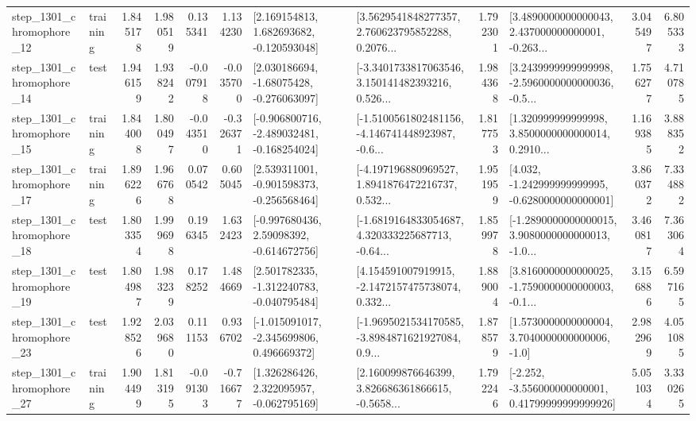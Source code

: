 \begin{tabular}{llrrrrllrlrr}
 step\_1301\_chromophore\_12 &  training &      1.845178 &    1.980519 &      0.135341 &  1.134230 &    [2.169154813, 1.682693682, -0.120593048] &  [3.5629541848277357, 2.760623795852288, 0.2076... &       1.792301 &  [3.4890000000000043, 2.437000000000001, -0.263... &            3.045497 &          6.805333 \\
 step\_1301\_chromophore\_14 &      test &      1.946159 &    1.938242 &     -0.007918 & -0.035700 &    [2.030186694, -1.68075428, -0.276063097] &  [-3.3401733817063546, 3.150141482393216, 0.526... &       1.984368 &  [3.2439999999999998, -2.5960000000000036, -0.5... &            1.756277 &          4.710785 \\
 step\_1301\_chromophore\_15 &  training &      1.844008 &    1.800497 &     -0.043510 & -0.326371 &  [-0.906800716, -2.489032481, -0.168254024] &  [-1.5100561802481156, -4.146741448923987, -0.6... &       1.817753 &  [1.320999999999998, 3.8500000000000014, 0.2910... &            1.169385 &          3.888352 \\
 step\_1301\_chromophore\_17 &  training &      1.896226 &    1.966768 &      0.070542 &  0.605045 &   [2.539311001, -0.901598373, -0.256568464] &  [-4.197196880969527, 1.8941876472216737, 0.532... &       1.951959 &   [4.032, -1.242999999999995, -0.6280000000000001] &            3.860372 &          7.334882 \\
 step\_1301\_chromophore\_18 &      test &      1.803354 &    1.999698 &      0.196345 &  1.632423 &    [-0.997680436, 2.59098392, -0.614672756] &  [-1.6819164833054687, 4.320333225687713, -0.64... &       1.859978 &  [-1.2890000000000015, 3.9080000000000013, -1.0... &            3.460817 &          7.363064 \\
 step\_1301\_chromophore\_19 &      test &      1.804987 &    1.983239 &      0.178252 &  1.484669 &   [2.501782335, -1.312240783, -0.040795484] &  [4.154591007919915, -2.1472157475738074, 0.332... &       1.889004 &  [3.8160000000000025, -1.7590000000000003, -0.1... &            3.156886 &          6.597165 \\
 step\_1301\_chromophore\_23 &      test &      1.928526 &    2.039680 &      0.111153 &  0.936702 &   [-1.015091017, -2.345699806, 0.496669372] &  [-1.9695021534170585, -3.8984871621927084, 0.9... &       1.878579 &     [1.5730000000000004, 3.7040000000000006, -1.0] &            2.982969 &          4.051085 \\
 step\_1301\_chromophore\_27 &  training &      1.904499 &    1.813195 &     -0.091303 & -0.716677 &    [1.326286426, 2.322095957, -0.062795169] &  [2.160099876646399, 3.826686361866615, -0.5658... &       1.792246 &  [-2.252, -3.556000000000001, 0.41799999999999926] &            5.051034 &          3.330265 \\

\end{tabular}
